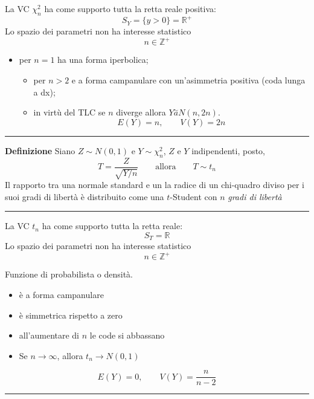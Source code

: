 \documentclass[
  11pt,
]{book}
\providecommand{\tightlist}{%
  \setlength{\itemsep}{0pt}\setlength{\parskip}{0pt}}
\theoremstyle{mytheoremstyle}
\theoremstyle{mydefstyle}
\begin{document}
La VC \(\chi^2_n\) ha come supporto tutta la retta reale positiva:
\[S_Y=\{y>0\}=\mathbb{R}^+\]
Lo spazio dei parametri non ha interesse statistico
\[n\in\mathbb{Z}^+\]

\begin{itemize}
\tightlist
\item
  per \(n = 1\) ha una forma iperbolica;

  \begin{itemize}
  \tightlist
  \item
    per \(n>2\) e a forma campanulare con un'asimmetria positiva (coda lunga a dx);
  \item
    in virtù del TLC se \(n\) diverge allora \(Y\stackrel{\sim}{a}N(n,2n)\).
    \[E(Y)=n,\qquad V(Y)=2n\]
  \end{itemize}
\end{itemize}

\begin{center}\rule{0.5\linewidth}{0.5pt}\end{center}

\textbf{Definizione}
Siano \(Z\sim N(0,1)\) e \(Y\sim\chi^2_n\), \(Z\) e \(Y\) indipendenti, posto,
\[T=\frac Z{\sqrt{Y/n}} \qquad \text{allora} \qquad T\sim t_n\]
Il rapporto tra una normale standard e un la radice di un chi-quadro diviso per i suoi gradi di libertà è distribuito come una \(t\)-Student con \(n\) \emph{gradi di libertà}

\begin{center}\rule{0.5\linewidth}{0.5pt}\end{center}

La VC \(t_n\) ha come supporto tutta la retta reale:
\[S_T=\mathbb{R}\]
Lo spazio dei parametri non ha interesse statistico
\[n\in\mathbb{Z}^+\]

Funzione di probabilista o densità.

\begin{itemize}
\tightlist
\item
  è a forma campanulare
\item
  è simmetrica rispetto a zero
\item
  all'aumentare di \(n\) le code si abbassano
\item
  Se \(n\to\infty\), allora \(t_n\to N(0,1)\)
\end{itemize}

\[E(Y)=0,\qquad V(Y)=\frac{n}{n-2}\]

\begin{center}\rule{0.5\linewidth}{0.5pt}\end{center}
\end{document}
